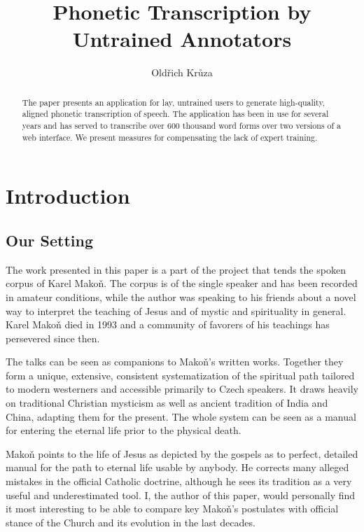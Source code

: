 \documentclass{itatnew}
\begin{document}
\title{Phonetic Transcription by Untrained Annotators}

\author{Oldřich Krůza}


\maketitle              %

\begin{abstract}
The paper presents an application for lay, untrained users to generate
high-quality, aligned phonetic transcription of speech. The application has been in use
for several years and has served to transcribe over 600 thousand word forms over
two versions of a web interface. We present measures for compensating the lack of expert training.
\end{abstract}

\section{Introduction}

\subsection{Our Setting}

The work presented in this paper is a part of the project that tends the spoken
corpus of Karel Mako\v{n}\cite{hajek2007cesky}. The corpus is of the single
speaker and has been recorded in amateur conditions, while the author was
speaking to his friends about a novel way to interpret the teaching of Jesus and
of mystic and spirituality in general. Karel Makoň died in 1993 and a community
of favorers of his teachings has persevered since then.

The talks can be seen as companions to Makoň's written works. Together they form
a unique, extensive, consistent systematization of the spiritual path tailored
to modern westerners and accessible primarily to Czech speakers. It draws
heavily on traditional Christian mysticism as well as ancient tradition of India
and China, adapting them for the present. The whole system can be seen as a
manual for entering the eternal life prior to the physical death.

Makoň points to the life of Jesus as depicted by the gospels as to perfect,
detailed manual for the path to eternal life usable by anybody. He corrects many
alleged mistakes in the official Catholic doctrine, although he sees its
tradition as a very useful and underestimated tool. I, the author of this paper,
would personally find it most interesting to be able to compare key Makoň's
postulates with official stance of the Church and its evolution in the last
decades.
\end{document}
